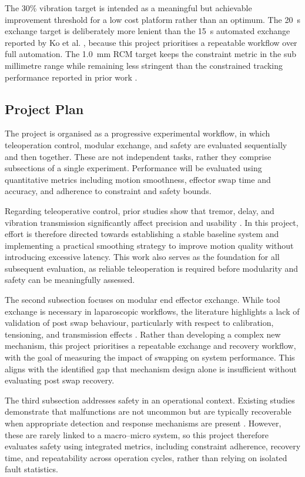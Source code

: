 \documentclass[12pt]{article}
\begin{document}
The 30\% vibration target is intended as a meaningful but achievable improvement threshold for a low cost platform rather than an optimum. 
The 20~s exchange target is deliberately more lenient than the 15~s automated exchange reported by Ko et al.
 \cite{ko2025tool}, because this project prioritises a repeatable workflow over full automation. 
 The 1.0~mm RCM target keeps the constraint metric in the sub millimetre range while remaining less stringent than the 
 constrained tracking performance reported in prior work \cite{sadeghian2019constrained}.

\subsection{Project Plan}

The project is organised as a progressive experimental workflow, in which teleoperation control,
modular exchange, and safety are evaluated sequentially and then together. 
These are not independent tasks, rather they comprise subsections of a single experiment. Performance will be evaluated 
using quantitative metrics including motion smoothness, 
effector swap time and accuracy, and adherence to constraint and safety bounds.

Regarding teleoperative control, prior
studies show that tremor, delay, and vibration transmission significantly affect
 precision and usability \cite{sang2016zero, batty2022transparent}. In
this project, effort is therefore directed towards establishing a stable baseline
system and implementing a practical smoothing strategy to improve motion
quality without introducing excessive latency. This work also serves as the
foundation for all subsequent evaluation, as reliable teleoperation is required
before modularity and safety can be meaningfully assessed.

The second subsection focuses on modular end effector exchange. While tool
exchange is necessary in laparoscopic workflows, the literature highlights a lack
of validation of post swap behaviour, particularly with respect to calibration,
tensioning, and transmission effects \cite{ko2025tool, hong2025backlash}. Rather
than developing a complex new mechanism, this project prioritises a repeatable
exchange and recovery workflow, with the goal of measuring the impact of swapping on system
performance. This aligns with the identified gap that
mechanism design alone is insufficient without evaluating post swap recovery.

The third subsection addresses safety in an operational context. Existing studies
demonstrate that malfunctions are not uncommon but are typically
recoverable when appropriate detection and response mechanisms are present
\cite{rajih2017error}. However, these are rarely linked to a macro--micro system, 
so this project therefore evaluates safety using integrated
metrics, including constraint adherence, recovery time, and repeatability across
operation cycles, rather than relying on isolated fault statistics.
\end{document}
